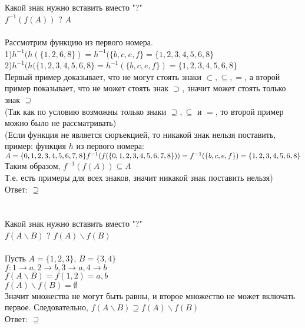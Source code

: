 \documentclass{article}
\begin{document}
\section{}
Какой знак нужно вставить вместо "?"\\
$f^{-1}(f(A))$ ? $A$\\\\
Рассмотрим функцию из первого номера.\\
1)$h^{-1}(h(\{1,2,6,8\})=h^{-1}(\{b,c,e,f\} = \{1,2,3,4,5,6,8\}$\\
2)$h^{-1}(h(\{1,2,3,4,5,6,8\}=h^{-1}(\{b,c,e,f\})=\{1,2,3,4,5,6,8\}$\\
Первый пример доказывает, что не могут стоять знаки $\subset, \subseteq, =$, а второй пример показывает, что не может стоять знак $\supset$, значит может стоять только знак $\supseteq$\\
(Так как по условию возможны только знаки $\supseteq, \subseteq $ и $ =$, то второй пример можно было не рассматривать)\\
(Если функция не является сюръекцией, то никакой знак нельзя поставить, пример: функция $h$ из первого номера:
$\\A=\{0,1,2,3,4,5,6,7,8\}\\
f^{-1}(f(\{0,1,2,3,4,5,6,7,8\}))=f^{-1}(\{b,c,e,f\})=\{1,2,3,4,5,6,8\}\\
$Таким образом, $f^{-1}(f(A))\subseteq A$\\Т.е. есть примеры для всех знаков, значит никакой знак поставить нельзя)
\\
Ответ: $\supseteq$
\section{}
Какой знак нужно вставить вместо "?"\\
$f(A\backslash B)$ ? $f(A) \backslash f(B)$\\\\
Пусть $A = \{1, 2, 3\}$, $B = \{3, 4\}$\\
$f: 1\rightarrow a, 2\rightarrow b, 3\rightarrow a, 4\rightarrow b$\\
$f(A\backslash B) = f({1, 2}) = {a, b}$\\
$f(A) \backslash f(B) = \emptyset$\\
Значит множества не могут быть равны, и второе множество не может включать первое. Следовательно, $f(A\backslash B) \supseteq f(A) \backslash f(B)$\\
Ответ: $\supseteq$
\end{document}
